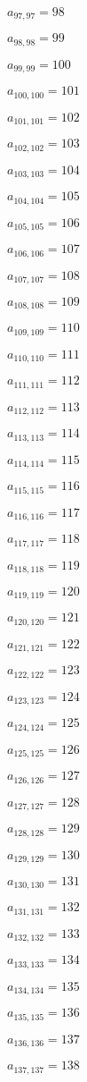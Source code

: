 \documentclass[a4paper,12pt]{article}
\begin{document}
$a _{ 97, 97 } = 98$

$a _{ 98, 98 } = 99$

$a _{ 99, 99 } = 100$

$a _{ 100, 100 } = 101$

$a _{ 101, 101 } = 102$

$a _{ 102, 102 } = 103$

$a _{ 103, 103 } = 104$

$a _{ 104, 104 } = 105$

$a _{ 105, 105 } = 106$

$a _{ 106, 106 } = 107$

$a _{ 107, 107 } = 108$

$a _{ 108, 108 } = 109$

$a _{ 109, 109 } = 110$

$a _{ 110, 110 } = 111$

$a _{ 111, 111 } = 112$

$a _{ 112, 112 } = 113$

$a _{ 113, 113 } = 114$

$a _{ 114, 114 } = 115$

$a _{ 115, 115 } = 116$

$a _{ 116, 116 } = 117$

$a _{ 117, 117 } = 118$

$a _{ 118, 118 } = 119$

$a _{ 119, 119 } = 120$

$a _{ 120, 120 } = 121$

$a _{ 121, 121 } = 122$

$a _{ 122, 122 } = 123$

$a _{ 123, 123 } = 124$

$a _{ 124, 124 } = 125$

$a _{ 125, 125 } = 126$

$a _{ 126, 126 } = 127$

$a _{ 127, 127 } = 128$

$a _{ 128, 128 } = 129$

$a _{ 129, 129 } = 130$

$a _{ 130, 130 } = 131$

$a _{ 131, 131 } = 132$

$a _{ 132, 132 } = 133$

$a _{ 133, 133 } = 134$

$a _{ 134, 134 } = 135$

$a _{ 135, 135 } = 136$

$a _{ 136, 136 } = 137$

$a _{ 137, 137 } = 138$
\end{document}
